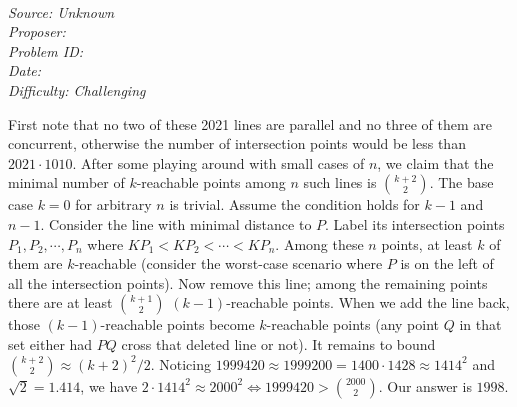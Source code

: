 \SSbreak\\
\emph{Source: Unknown}\\
\emph{Proposer: \Paiya}\\ %
\emph{Problem ID:}\\
\emph{Date: }\\
\emph{Difficulty: Challenging}\\
\SSbreak

\bigskip

\begin{solution}\hfil\medskip
    
    First note that no two of these 2021 lines are parallel and no three of them are concurrent, otherwise the number of intersection points
    would be less than $2021 \cdot 1010$. After some playing around with small cases of $n$, we claim that the minimal number of $k$-reachable points among $n$ such lines is $\binom{k + 2}{2}$. 
    The base case $k = 0$ for arbitrary $n$ is trivial. Assume the condition holds for $k - 1$ and $n - 1$. 
    Consider the line with minimal distance to $P$. Label its intersection points $P_1, P_2, \cdots , P_n$ where $KP_1 < KP_2 < \cdots < KP_n$. 
    Among these $n$ points, at least $k$ of them are $k$-reachable (consider the worst-case scenario where $P$ is on the left of all the intersection points).
    Now remove this line; among the remaining points there are at least $\binom{k + 1}{2}$ $(k - 1)$-reachable points. 
    When we add the line back, those $(k - 1)$-reachable points become $k$-reachable points (any point $Q$ in that set either had $PQ$ cross that deleted line or not).
    It remains to bound $\binom{k + 2}{2} \approx (k + 2)^2/2$. Noticing $1999420 \approx 1999200 = 1400 \cdot 1428 \approx 1414^2$ and $\sqrt{2} = 1.414$, we have
    $2 \cdot 1414^2 \approx 2000^2 \iff 1999420 > \binom{2000}{2}$. Our answer is $\boxed{1998}$. 
\end{solution}\bigskip